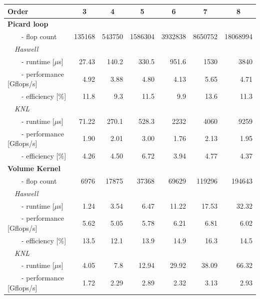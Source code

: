 \documentclass{acm_proc_article-sp}
\begin{document}
\begin{table}
  \centering
\begin{tabular}{l|rrrrrr}
  \textbf{Order}                & \multicolumn{1}{c}{3}& \multicolumn{1}{c}{4}&\multicolumn{1}{c}{5}&\multicolumn{1}{c}{6}&\multicolumn{1}{c}{7}& \multicolumn{1}{c}{8}\\ \hline
\textbf{Picard loop}            &&&&&&\\
 ~~~~- flop count                            & 135168& 543750 & 1586304& 3932838 & 8650752 & 18068994 \\ 
~~\textit{Haswell}            &&&&&&\\
 ~~~~- runtime [$\mu{}$s]               & 27.43  & 140.2   & 330.5   & 951.6    & 1530    & 3840  \\
 ~~~~- performance [Gflops/s]           & 4.92  & 3.88   & 4.80   & 4.13    & 5.65    & 4.71  \\
 ~~~~- efficiency [\%]                  & 11.8  & 9.3   & 11.5   & 9.9    & 13.6    & 11.3  \\ 
~~\textit{KNL}            &&&&&&\\
 ~~~~- runtime [$\mu{}$s]               & 71.22  & 270.1   & 528.3   & 2232    & 4060    & 9259  \\
 ~~~~- performance [Gflops/s]           & 1.90  & 2.01   & 3.00   & 1.76    & 2.13    & 1.95  \\
 ~~~~- efficiency [\%]                  & 4.26 & 4.50 & 6.72 & 3.94 & 4.77 & 4.37  \\ \hline
\textbf{Volume Kernel}                   & &&&&& \\
 ~~~~- flop count                            & 6976 & 17875  & 37368 & 69629 & 119296 & 194643 \\
~~\textit{Haswell}            &&&&&&\\
 ~~~~- runtime [$\mu$s]                 & 1.24  & 3.54   & 6.47   & 11.22    & 17.53   & 32.32  \\  
 ~~~~- performance [Gflops/s]           & 5.62  & 5.05   & 5.78   & 6.21    & 6.81    & 6.02  \\   
 ~~~~- efficiency [\%]                  & 13.5  & 12.1   & 13.9   & 14.9    & 16.3    & 14.5  \\
~~\textit{KNL}            &&&&&&\\ 
 ~~~~- runtime [$\mu$s]                 & 4.05  & 7.8   & 12.94   & 29.92    & 38.09    & 66.32  \\
 ~~~~- performance [Gflops/s]           & 1.72  & 2.29   & 2.89   & 2.32    & 3.13    & 2.93  \\ 

\end{tabular}
\end{table}
\end{document}
